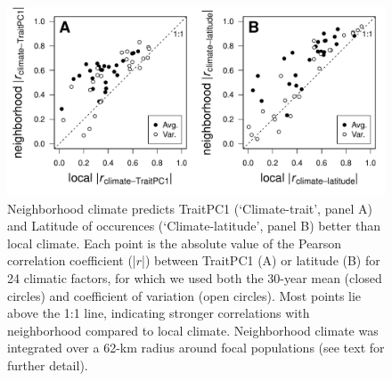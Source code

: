 \documentclass[11pt, oneside]{article}
\begin{document}

\begin{figure}[h!]
\centerline{\includegraphics[width=1\textwidth]{Figures/Figure_LocalvNeighCorr.pdf}}
\fontsize{10}{12}
\selectfont
\caption[Local versus neighborhood correlations]{Neighborhood climate predicts TraitPC1 (`Climate-trait', panel A) and Latitude of occurences (`Climate-latitude', panel B) better than local climate. Each point is the absolute value of the Pearson correlation coefficient (|$r$|) between TraitPC1 (A) or latitude (B) for 24 climatic factors, for which we used both the 30-year mean (closed circles) and coefficient of variation (open circles). Most points lie above the 1:1 line, indicating stronger correlations with neighborhood compared to local climate. Neighborhood climate was integrated over a 62-km radius around focal populations (see text for further detail).}
\label{fig:Fig_LocalvNeighCorr}
\end{figure}

\end{document}
